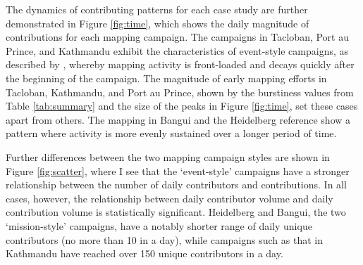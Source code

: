 The dynamics of contributing patterns for each case study are further demonstrated in Figure \ref{fig:time}, which shows the daily magnitude of contributions for each mapping campaign. The campaigns in Tacloban, Port au Prince, and Kathmandu exhibit the characteristics of event-style campaigns, as described by \textcite{dittus_mass_2017}, whereby mapping activity is front-loaded and decays quickly after the beginning of the campaign. The magnitude of early mapping efforts in Tacloban, Kathmandu, and Port au Prince, shown by the burstiness values from Table \ref{tab:summary} and the size of the peaks in Figure \ref{fig:time}, set these cases apart from others. The mapping in Bangui and the Heidelberg reference show a pattern where activity is more evenly sustained over a longer period of time. 

Further differences between the two mapping campaign styles are shown in Figure \ref{fig:scatter}, where I see that the ‘event-style’ campaigns have a stronger relationship between the number of daily contributors and contributions.  In all cases, however, the relationship between daily contributor volume and daily contribution volume is statistically significant. Heidelberg and Bangui, the two ‘mission-style’ campaigns, have a notably shorter range of daily unique contributors (no more than 10 in a day), while campaigns such as that in Kathmandu have reached over 150 unique contributors in a day. 

